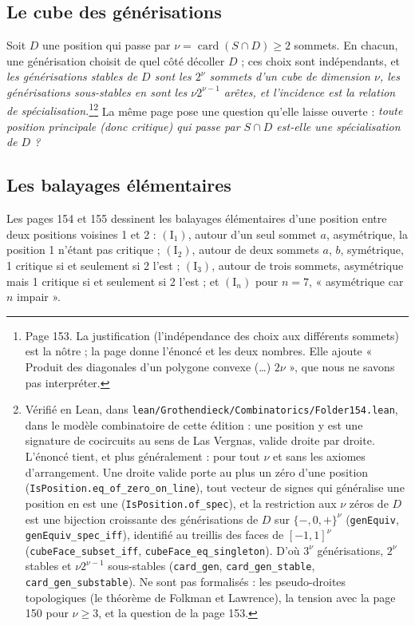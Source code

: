 \documentclass[11pt,a4paper]{article}
\begin{document}
\subsection*{Le cube des générisations}

Soit $D$ une position qui passe par $\nu = \operatorname{card}(S \cap D)
\geqslant 2$ sommets. En chacun, une générisation choisit de quel côté
décoller $D$ ; ces choix sont indépendants, et
\emph{les générisations stables de $D$ sont les $2^{\nu}$ sommets d'un cube de
dimension $\nu$, les générisations sous-stables en sont les $\nu 2^{\nu - 1}$
arêtes, et l'incidence est la relation de spécialisation.}\footnote{Page 153.
La justification (l'indépendance des choix aux différents sommets) est la
nôtre ; la page donne l'énoncé et les deux nombres. Elle ajoute « Produit des
diagonales d'un polygone convexe (\ldots) $2\nu$ », que nous ne savons pas
interpréter.}\footnote{Vérifié en Lean, dans
\texttt{lean/Grothendieck/Combinatorics/Folder154.lean}, dans le modèle combinatoire de cette
édition : une position y est une signature de cocircuits au sens de Las Vergnas,
valide droite par droite. L'énoncé tient, et plus généralement : pour tout
$\nu$ et sans les axiomes d'arrangement. Une droite valide porte au plus un zéro
d'une position (\texttt{IsPosition.eq\_of\_zero\_on\_line}), tout vecteur de
signes qui généralise une position en est une (\texttt{IsPosition.of\_spec}), et
la restriction aux $\nu$ zéros de $D$ est une bijection croissante des
générisations de $D$ sur $\lbrace -, 0, + \rbrace^{\nu}$ (\texttt{genEquiv},
\texttt{genEquiv\_spec\_iff}), identifié au treillis des faces de
$[-1, 1]^{\nu}$ (\texttt{cubeFace\_subset\_iff},
\texttt{cubeFace\_eq\_singleton}). D'où $3^{\nu}$ générisations, $2^{\nu}$
stables et $\nu 2^{\nu-1}$ sous-stables (\texttt{card\_gen},
\texttt{card\_gen\_stable}, \texttt{card\_gen\_substable}). Ne sont pas
formalisés : les pseudo-droites topologiques (le théorème de Folkman et
Lawrence), la tension avec la page 150 pour $\nu \geqslant 3$, et la question
de la page 153.} La même page pose une question qu'elle laisse ouverte :
\emph{toute position principale (donc critique) qui passe par $S \cap D$
est-elle une spécialisation de $D$ ?}

\subsection*{Les balayages élémentaires}

Les pages 154 et 155 dessinent les balayages élémentaires d'une position entre
deux positions voisines 1 et 2 : $(\mathrm{I}_1)$, autour d'un seul sommet $a$,
asymétrique, la position 1 n'étant pas critique ; $(\mathrm{I}_2)$, autour de
deux sommets $a$, $b$, symétrique, 1 critique si et seulement si 2 l'est ;
$(\mathrm{I}_3)$, autour de trois sommets, asymétrique mais 1 critique si et
seulement si 2 l'est ; et $(\mathrm{I}_n)$ pour $n = 7$, « asymétrique car $n$
impair ».
\end{document}
